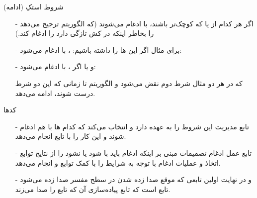 \begin{frame}{شروط استکِ  (ادامه)}
\begin{itemize}\itemr
\item[-]
اگر
هر کدام از  یا  که کوچک‌تر باشند، با  ادغام می‌شوند (که الگوریتم ترجیح می‌دهد  را بخاطر اینکه در کش تازگی دارد را ادغام کند.)

\item[-]
برای مثال اگر این ها را داشته باشیم:
،
با
ادغام می‌شود:
\begin{lfl}
\end{lfl}

\item[-]
و یا اگر
،
با
ادغام می‌شود:
\begin{lfl}
\end{lfl}

که در هر دو مثال شرط دوم نقض می‌شود و الگوریتم تا زمانی که این دو شرط درست شوند، ادامه می‌دهد.
\end{itemize}
\end{frame}

\begin{frame}{کدها}
\begin{itemize}\itemr
\item[-]
تابع 
مدیریت این شروط را به عهده دارد و انتخاب می‌کند که کدام ها با هم ادغام شوند و این کار را با تابع 
انجام می‌دهد.

\item[-]
تابع
عمل ادغام تصمیمات مبنی بر اینکه ادغام باید با  شود یا نشود را از نتایج توابع  اتخاذ و عملیات ادغام با توجه به شرایط را با کمک توابع
و
انجام می‌دهد.

\item[-]
و در نهایت اولین تابعی که موقع صدا زده شدن 
در سطح مفسر صدا زده می‌شود تابع
است که تابع پیاده‌سازی آن که تابع
را صدا می‌زند.
\end{itemize}
\end{frame}